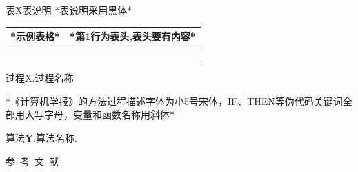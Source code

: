 \documentclass[10.5pt,compsoc]{CjC}
\theoremstyle{mystyle}
\begin{document}
\begin{table}[htbp]
	\centering 表X\quad 表说明 *表说明采用黑体*
	\vspace {-2.5mm}
	\begin{center}
		\begin{tabular}{ll}
			\toprule
			*示例表格*&*第1行为表头,表头要有内容* \\
			\hline
			& \\
			& \\
			& \\
			& \\
			\bottomrule
		\end{tabular}
		\label{tab1}
	\end{center}
\end{table}

过程X.\quad 过程名称

{*《计算机学报》的方法过程描述字体为小5号宋体，IF、THEN等伪代码关键词全部用大写字母，变量和函数名称用斜体*}

算法\textbf{Y}.\quad 算法名称.

\vspace {3mm}

\vspace {5mm}
\centerline
{
	参~考~文~献}
\end{document}
